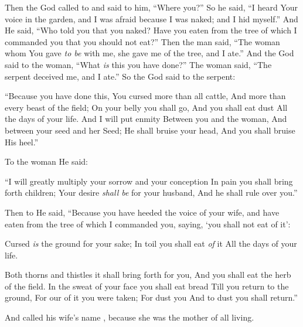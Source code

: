 \bverse Then the \lord God called to  and said to him, ``Where \are you?''
\bverse So he said, ``I heard Your voice in the garden, and I was afraid because I was naked; and I hid myself.''
\bverse And He said, ``Who told you that you \were naked? Have you eaten from the tree of which I commanded you that you should not eat?''
\bverse Then the man said, ``The woman whom You gave \textit{to be} with me, she gave me of the tree, and I ate.''
\bverse And the \lord God said to the woman, ``What \textit{is} this you have done?'' The woman said, ``The serpent deceived me, and I ate.''
\bverse So the \lord God said to the serpent: 
\begin{bquotation}
``Because you have done this, You \are cursed more than all cattle, And more than every beast of the field; On your belly you shall go, And you shall eat dust All the days of your life.
\bverse And I will put enmity Between you and the woman, And between your seed and her Seed; He shall bruise your head, And you shall bruise His heel.''
\end{bquotation}
\bverse To the woman He said: 
\begin{bquotation}
``I will greatly multiply your sorrow and your conception In pain you shall bring forth children; Your desire \textit{shall be} for your husband, And he shall rule over you.''
\end{bquotation}
\bverse Then to  He said, ``Because you have heeded the voice of your wife, and have eaten from the tree of which I commanded you, saying, `you shall not eat of it':
\begin{bquotation}
Cursed \textit{is} the ground for your sake; In toil you shall eat \textit{of} it All the days of your life.

\bverse Both thorns and thistles it shall bring forth for you, And you shall eat the herb of the field.
\bverse In the sweat of your face you shall eat bread Till you return to the ground, For our of it you were taken; For dust you \are And to dust you shall return.''
\end{bquotation}
\bverse And  called his wife's name , because she was the mother of all living.

